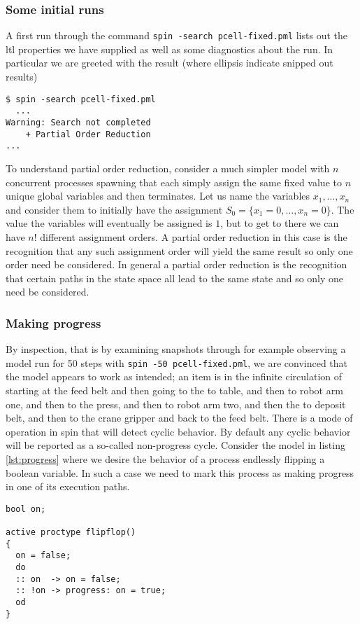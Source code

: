 \documentclass[12pt]{article}
\begin{document}
\subsubsection*{Some initial runs}
A first run through the command \texttt{spin -search pcell-fixed.pml} lists out the ltl properties
we have supplied as well as some diagnostics about the run. In particular we are greeted with
the result (where ellipsis indicate snipped out results) 
\begin{verbatim}
$ spin -search pcell-fixed.pml
  ...
Warning: Search not completed
	+ Partial Order Reduction
...
\end{verbatim}
To understand partial order reduction, consider a much simpler model with $n$ concurrent processes spawning that each simply assign the same fixed value to
$n$ unique global variables and then terminates. Let us name the variables $x_1,\ldots,x_n$ and consider them to initially have the assignment
$S_0=\{x_1=0,\ldots,x_n=0\}$. The value the variables will eventually be assigned is $1$, but to get to there we can have
$n!$ different assignment orders. A partial order reduction in this case is the recognition that any such assignment order will yield the same result so
only one order need be considered. In general a partial order reduction is the recognition that certain paths in the state space all lead to the same state
and so only one need be considered.

\subsubsection*{Making progress}
By inspection, that is by examining snapshots through for example observing a model run for 50 steps with
\texttt{spin -50 pcell-fixed.pml}, we are convinced
that the model appears to work as intended; an item is in the infinite circulation  of starting at the feed belt and then going to the to table, and then
to robot arm one, and then to the press, and then to robot arm two, and then the to deposit belt, and then to the crane gripper and back to the feed belt.
There is a mode of operation in spin that will detect cyclic behavior. By default any cyclic behavior will be reported
as a so-called non-progress cycle. Consider the model in listing \ref{lst:progress} where we desire the behavior of a process endlessly flipping
a boolean variable. In such a case we need to mark this process as making progress in one of its execution paths.

\begin{lstlisting}[caption={Progress labeling},label={lst:progress}]
bool on;

active proctype flipflop()
{
  on = false;
  do
  :: on  -> on = false;
  :: !on -> progress: on = true;
  od
}
\end{lstlisting}
\end{document}
